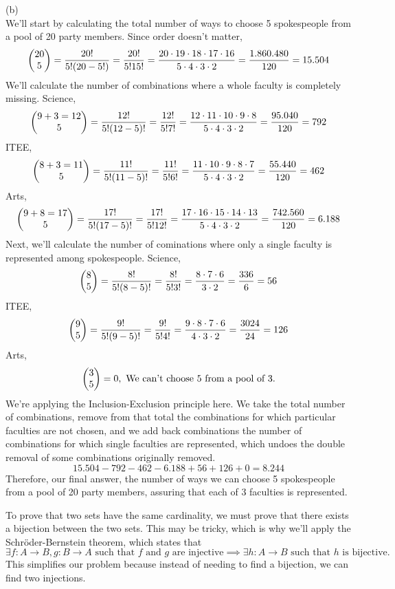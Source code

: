 \documentclass[a4paper, 11pt]{report}
\begin{document}
\newpage
\sol (b) \\
We'll start by calculating the total number of ways to choose 5 spokespeople from a pool of 20 party members. Since order doesn't matter,
$$
  \begin{pmatrix} 20 \\ 5 \end{pmatrix} = \frac{20!}{5!(20-5!)} = \frac{20!}{5!15!} = \frac{20\cdot19\cdot18\cdot17\cdot16}{5\cdot4\cdot3\cdot2} = \frac{1.860.480}{120} = 15.504
$$
We'll calculate the number of combinations where a whole faculty is completely missing. Science,
$$
  \begin{pmatrix} 9+3=12 \\ 5 \end{pmatrix} = \frac{12!}{5!(12-5)!} = \frac{12!}{5!7!} = \frac{12\cdot11\cdot10\cdot9\cdot8}{5\cdot4\cdot3\cdot2} = \frac{95.040}{120} = 792
$$
ITEE,
$$
  \begin{pmatrix} 8+3=11 \\ 5 \end{pmatrix} = \frac{11!}{5!(11-5)!} = \frac{11!}{5!6!} = \frac{11\cdot10\cdot9\cdot8\cdot7}{5\cdot4\cdot3\cdot2} = \frac{55.440}{120} = 462
$$
Arts,
$$
  \begin{pmatrix} 9+8=17 \\ 5 \end{pmatrix} = \frac{17!}{5!(17-5)!} = \frac{17!}{5!12!} = \frac{17\cdot16\cdot15\cdot14\cdot13}{5\cdot4\cdot3\cdot2} = \frac{742.560}{120} = 6.188
$$
Next, we'll calculate the number of cominations where only a single faculty is represented among spokespeople. Science,
$$
  \begin{pmatrix} 8 \\ 5 \end{pmatrix} = \frac{8!}{5!(8-5)!} = \frac{8!}{5!3!} = \frac{8\cdot7\cdot6}{3\cdot2} = \frac{336}{6} = 56
$$
ITEE,
$$
  \begin{pmatrix} 9 \\ 5 \end{pmatrix} = \frac{9!}{5!(9-5)!} = \frac{9!}{5!4!} = \frac{9\cdot8\cdot7\cdot6}{4\cdot3\cdot2} = \frac{3024}{24} = 126
$$
Arts,
$$
  \comb{3}{5} = 0,\ \text{We can't choose 5 from a pool of 3.}
$$
We're applying the Inclusion-Exclusion principle here. We take the total number of combinations, remove from that total the combinations for which particular faculties are not chosen, and we add back combinations the number of combinations for which single faculties are represented, which undoes the double removal of some combinations originally removed.
$$
15.504 - 792 - 462 - 6.188 + 56 + 126 + 0 = 8.244
$$
Therefore, our final answer, the number of ways we can choose 5 spokespeople from a pool of 20 party members, assuring that each of 3 faculties is represented.

\newpage
{}
\sol To prove that two sets have the same cardinality, we must prove that there exists a bijection between the two sets. This may be tricky, which is why we'll apply the Schr\"oder-Bernstein theorem, which states that
$$
  \exists f:A\to B, g:B\to A \text{ such that } f \text{ and } g \text{ are injective} \implies \exists h:A\to B \text{ such that } h \text{ is bijective.}
$$
This simplifies our problem because instead of needing to find a bijection, we can find two injections. \\
\end{document}
